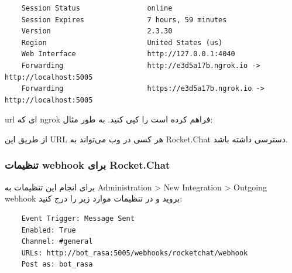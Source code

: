 \begin{latin}
    \begin{verbatim}
    Session Status                online                                                                                                                                                                        
    Session Expires               7 hours, 59 minutes                                                                                                                                                           
    Version                       2.3.30                                                                                                                                                                        
    Region                        United States (us)                                                                                                                                                            
    Web Interface                 http://127.0.0.1:4040                                                                                                                                                         
    Forwarding                    http://e3d5a17b.ngrok.io -> http://localhost:5005                                                                                                                             
    Forwarding                    https://e3d5a17b.ngrok.io -> http://localhost:5005  
    \end{verbatim}
\end{latin}

url ای که ngrok فراهم کرده است را کپی کنید.
به طور مثال:


از طریق این URL هر کسی در وب می‌تواند به Rocket.Chat دسترسی داشته باشد.

\subsubsection{تنظیمات webhook برای Rocket.Chat}

برای انجام این تنظیمات به Administration > New Integration > Outgoing webhook بروید و در تنظیمات موارد زیر را درج کنید:

\begin{latin}
    \begin{verbatim}
    Event Trigger: Message Sent
    Enabled: True
    Channel: #general
    URLs: http://bot_rasa:5005/webhooks/rocketchat/webhook
    Post as: bot_rasa
    \end{verbatim}
\end{latin}

